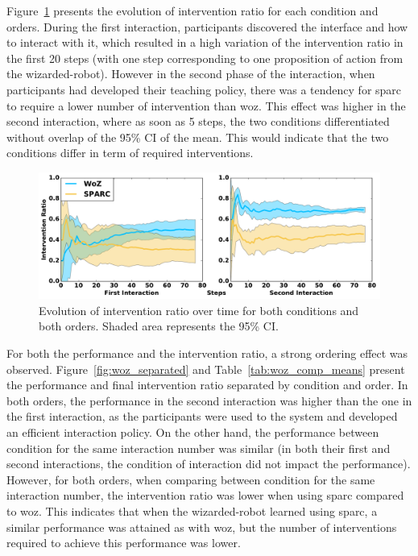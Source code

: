 Figure~\ref{fig:woz_ratio_time} presents the evolution of intervention ratio for each condition and orders. During the first interaction, participants discovered the interface and how to interact with it, which resulted in a high variation of the intervention ratio in the first 20 steps (with one step corresponding to one proposition of action from the wizarded-robot). However in the second phase of the interaction, when participants had developed their teaching policy, there was a tendency for \gls{sparc} to require a lower number of intervention than \gls{woz}. This effect was higher in the second interaction, where as soon as 5 steps, the two conditions differentiated without overlap of the 95\% CI of the mean. This would indicate that the two conditions differ in term of required interventions.

\begin{figure}[ht]
	\centering
	\includegraphics[width=1.\textwidth]{ratio_time.pdf}
	\caption{Evolution of intervention ratio over time for both conditions and both orders. Shaded area represents the 95\% CI.}
	\label{fig:woz_ratio_time}
\end{figure}

For both the performance and the intervention ratio, a strong ordering effect was observed. Figure~\ref{fig:woz_separated} and Table~\ref{tab:woz_comp_means} present the performance and final intervention ratio separated by condition and order. In both orders, the performance in the second interaction was higher than the one in the first interaction, as the participants were used to the system and developed an efficient interaction policy. On the other hand, the performance between condition for the same interaction number was similar (in both their first and second interactions, the condition of interaction did not impact the performance). However, for both orders, when comparing between condition for the same interaction number, the intervention ratio was lower when using \gls{sparc} compared to \gls{woz}. This indicates that when the wizarded-robot learned using \gls{sparc}, a similar performance was attained as with \gls{woz}, but the number of interventions required to achieve this performance was lower.

